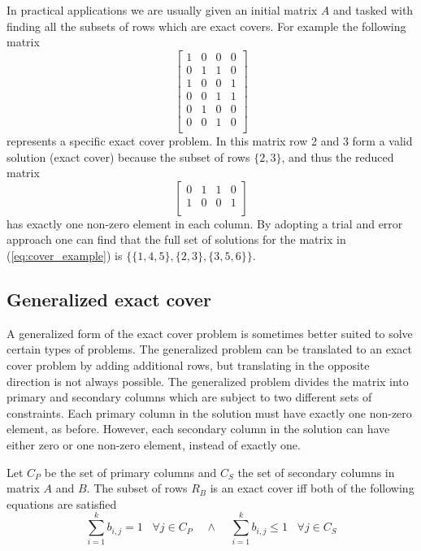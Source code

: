 \begin{example}
In practical applications we are usually given an initial matrix $A$ and tasked with finding all the subsets of rows which are exact covers.
For example the following matrix
\begin{equation}
	\left[
	\begin{array}{cccc}
		1 & 0 & 0 & 0 \\
		0 & 1 & 1 & 0 \\
		1 & 0 & 0 & 1 \\
		0 & 0 & 1 & 1 \\
		0 & 1 & 0 & 0 \\
		0 & 0 & 1 & 0 \\
	\end{array}
	\right]
	\label{eq:cover_example}
\end{equation}
represents a specific exact cover problem.
In this matrix row 2 and 3 form a valid solution (exact cover) because the subset of rows $\{ 2, 3 \}$, and thus the reduced matrix
\[
\left[
\begin{array}{cccc}
	0 & 1 & 1 & 0 \\
	1 & 0 & 0 & 1 \\
\end{array}
\right]
\]
has exactly one non-zero element in each column.
By adopting a trial and error approach one can find that the full set of solutions for the matrix in (\ref{eq:cover_example}) is $\{ \{1, 4, 5 \}, \{ 2, 3\}, \{ 3, 5, 6\} \}$.
\end{example}


\subsection{Generalized exact cover}

A generalized form of the exact cover problem is sometimes better suited to solve certain types of problems.
The generalized problem can be translated to an exact cover problem by adding additional rows, but translating in the opposite direction is not always possible.
The generalized problem divides the matrix into primary and secondary columns which are subject to two different sets of constraints.
Each primary column in the solution must have exactly one non-zero element, as before.
However, each secondary column in the solution can have either zero or one non-zero element, instead of exactly one.

Let $C_P$ be the set of primary columns and $C_S$ the set of secondary columns in matrix $A$ and $B$.
The subset of rows $R_B$ is an exact cover iff both of the following equations are satisfied
\[
	\sum_{i = 1}^{k} b_{i,j} = 1 \;\;\; \forall j \in C_P  \;\;\;\; \wedge \;\;\;\;  \sum_{i = 1}^{k} b_{i,j} \leq 1 \;\;\; \forall j \in C_S
\]


